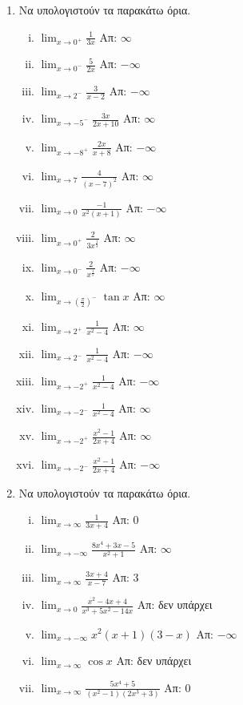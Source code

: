 \begin{enumerate}
    \item Να υπολογιστούν τα παρακάτω όρια.

        \begin{enumerate}[i)]
            \item $\lim_{x\to 0^+}\frac{1}{3x}$ \hfill Απ: $\infty$
            \item $\lim_{x\to 0^-}\frac{5}{2x}$ \hfill Απ: $-\infty$
            \item $\lim_{x\to 2^-}\frac{3}{x-2}$ \hfill Απ: $-\infty$
            \item $\lim_{x\to -5^-}\frac{3x}{2x+10}$ \hfill Απ: $\infty$
            \item $\lim_{x\to -8^+}\frac{2x}{x+8}$ \hfill Απ: $-\infty$
            \item $\lim_{x\to 7}\frac{4}{(x-7)^2}$ \hfill Απ: $\infty$
            \item $\lim_{x\to 0}\frac{-1}{x^2(x+1)}$ \hfill Απ: $-\infty$
            \item $\lim_{x\to 0^+}\frac{2}{3x^{\frac{1}{3}}}$ \hfill Απ: $\infty$
            \item $\lim_{x\to 0^-}\frac{2}{x^{\frac{1}{5}}}$ \hfill Απ: $-\infty$
            \item $\lim_{x\to \left(\frac{\pi}{2}\right)^-}\tan x$ \hfill Απ: $\infty$
            \item $\lim_{x\to 2^+}\frac{1}{x^2-4}$ \hfill Απ: $\infty$
            \item $\lim_{x\to 2^-}\frac{1}{x^2-4}$ \hfill Απ: $-\infty$
            \item $\lim_{x\to -2^+}\frac{1}{x^2-4}$ \hfill Απ: $-\infty$
            \item $\lim_{x\to -2^-}\frac{1}{x^2-4}$ \hfill Απ: $\infty$
            \item $\lim_{x\to -2^+}\frac{x^2-1}{2x+4}$ \hfill Απ: $\infty$
            \item $\lim_{x\to -2^-}\frac{x^2-1}{2x+4}$ \hfill Απ: $-\infty$
        \end{enumerate}

    \item Να υπολογιστούν τα παρακάτω όρια.

        \begin{enumerate}[i)]
            \item $\lim_{x\to \infty}\frac{1}{3x+4}$ \hfill Απ: $0$
            \item $\lim_{x\to -\infty}\frac{8x^4+3x-5}{x^2+1}$ \hfill Απ: $\infty$
            \item $\lim_{x\to \infty}\frac{3x+4}{x-7}$ \hfill Απ: $3$
            \item $\lim_{x\to 0}\frac{x^{2}-4x+4}{x^3+5x^2-14x}$ \hfill Απ: δεν υπάρχει
            \item $\lim_{x\to -\infty}x^2(x+1)(3-x)$ \hfill Απ: $-\infty$
            \item $\lim_{x\to \infty}\cos x$ \hfill Απ: δεν υπάρχει
            \item $\lim_{x\to \infty}\frac{5x^4+5}{(x^2-1)(2x^3+3)}$ \hfill Απ: $0$
        \end{enumerate}
\end{enumerate}


